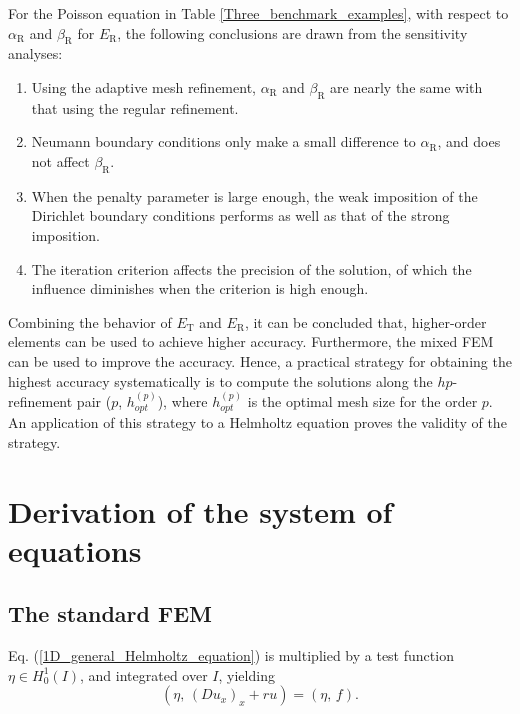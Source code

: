 \documentclass[final,3p]{elsarticle}
\begin{document}

For the Poisson equation in Table \ref{Three_benchmark_examples}, with respect to $\alpha _{\text{R}}$ and $\beta _{\text{R}}$ for ${E}_{\text{R}}$, the following conclusions are drawn from the sensitivity analyses:
\begin{enumerate}
 \item Using the adaptive mesh refinement, $\alpha _{\text{R}}$ and $\beta _{\text{R}}$ are nearly the same with that using the regular refinement. 
 \item Neumann boundary conditions only make a small difference to $\alpha _{\text{R}}$, and does not affect $\beta _{\text{R}}$. 
 \item When the penalty parameter is large enough, the weak imposition of the Dirichlet boundary conditions performs as well as that of the strong imposition.
 \item The iteration criterion affects the precision of the solution, of which the influence diminishes when the criterion is high enough.
\end{enumerate}


Combining the behavior of ${E}_{\text{T}}$ and ${E}_{\text{R}}$, it can be concluded that, higher-order elements can be used to achieve higher accuracy. 
Furthermore, the mixed FEM can be used to improve the accuracy.
Hence, a practical strategy for obtaining the highest accuracy systematically is to compute the solutions along the $hp$-refinement pair ($p$, $h_{opt}^{(p)}$), where $h_{opt}^{(p)}$ is the optimal mesh size for the order $p$. 
An application of this strategy to a Helmholtz equation proves the validity of the strategy.

\appendix
 
  
\section{Derivation of the system of equations}		\label{system equation appendix}

\subsection{The standard FEM} 

 Eq. (\ref{1D_general_Helmholtz_equation}) is multiplied by a test function $\eta \in H _0^1 (I)$, and integrated over $I$, yielding
\begin{equation}
(\eta, \, \left(D u_x \right)_x + ru) = (\eta, \, f). \label{1D_general_inte}
\end{equation}
\end{document}
